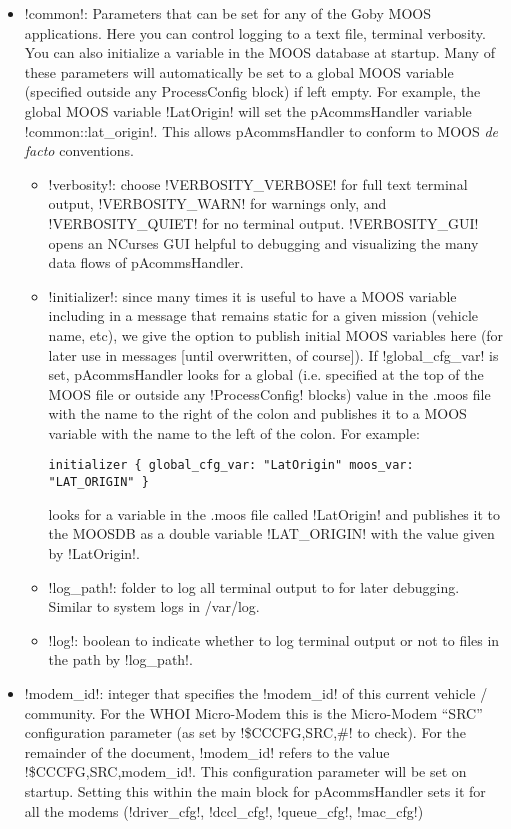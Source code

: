 \begin{itemize}
\item !common!: Parameters that can be set for any of the Goby MOOS applications. Here you can control logging to a text file, terminal verbosity. You can also initialize a variable in the MOOS database at startup. Many of these parameters will automatically be set to a global MOOS variable (specified outside any ProcessConfig block) if left empty. For example, the global MOOS variable !LatOrigin! will set the pAcommsHandler variable !common::lat_origin!. This allows pAcommsHandler to conform to MOOS \textit{de facto} conventions.
\begin{itemize}
\item !verbosity!: choose !VERBOSITY_VERBOSE! for full text terminal output, !VERBOSITY_WARN! for warnings only, and !VERBOSITY_QUIET! for no terminal output. !VERBOSITY_GUI! opens an NCurses GUI helpful to debugging and visualizing the many data flows of pAcommsHandler. 
\item !initializer!: since many times it is useful to have a MOOS variable including in a message that remains static for a given mission (vehicle name, etc), we give the option to publish initial MOOS variables here (for later use in messages [until overwritten, of course]). If !global_cfg_var! is set, pAcommsHandler looks for a global (i.e. specified at the top of the MOOS file or outside any !ProcessConfig! blocks) value in the .moos file with the name to the right of the colon and publishes it to a MOOS variable with the name to the left of the colon. For example:
\begin{verbatim}
initializer { global_cfg_var: "LatOrigin" moos_var: "LAT_ORIGIN" } 
\end{verbatim}
\resetbvlinenumber
looks for a variable in the .moos file called !LatOrigin! and publishes it to the MOOSDB as a double variable !LAT_ORIGIN! with the value given by !LatOrigin!.
\item !log_path!: folder to log all terminal output to for later debugging. Similar to system logs in /var/log.
\item !log!: boolean to indicate whether to log terminal output or not to files in the path by !log_path!.
\end{itemize}
\item !modem_id!: integer that specifies the !modem_id! of this current vehicle / community. For the WHOI Micro-Modem this is the Micro-Modem ``SRC'' configuration parameter (as set by !\$CCCFG,SRC,#! to check). For the remainder of the document, !modem_id! refers to the value !\$CCCFG,SRC,modem_id!. This configuration parameter will be set on startup. Setting this within the main block for pAcommsHandler sets it for all the modems (!driver_cfg!, !dccl_cfg!, !queue_cfg!, !mac_cfg!)

\end{itemize}

